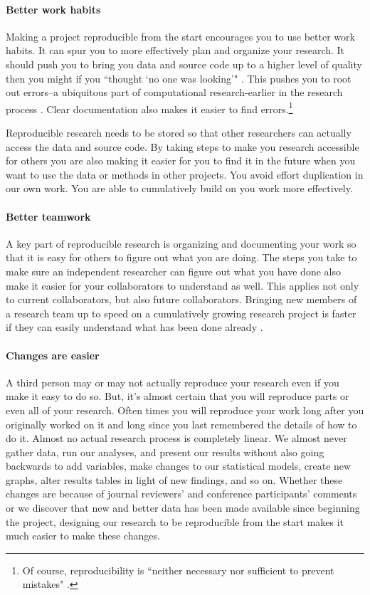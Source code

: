 \paragraph{Better work habits}
Making a project reproducible from the start encourages you to use better work habits. It can spur you to more effectively plan and organize your research. It should push you to bring you data and source code up to a higher level of quality then you might if you ``thought `no one was looking'" \cite[386]{Donoho2010}. This pushes you to root out errors--a ubiquitous part of computational research-earlier in the research process \cite[385]{Donoho2010}. Clear documentation also makes it easier to find errors.\footnote{Of course, reproducibility is ``neither necessary nor sufficient to prevent mistakes" \cite[]{Stodden2009b}.}

Reproducible research needs to be stored so that other researchers can actually access the data and source code. By taking steps to make you research accessible for others you are also making it easier for you to find it in the future when you want to use the data or methods in other projects. You avoid effort duplication in our own work. You are able to cumulatively build on you work more effectively.

\paragraph{Better teamwork}
A key part of reproducible research is organizing and documenting your work so that it is easy for others to figure out what you are doing. The steps you take to make sure an independent researcher can figure out what you have done also make it easier for your collaborators to understand as well. This applies not only to current collaborators, but also future collaborators. Bringing new members of a research team up to speed on a cumulatively growing research project is faster if they can easily understand what has been done already \cite[386]{Donoho2010}. 

\paragraph{Changes are easier}
A third person may or may not actually reproduce your research even if you make it easy to do so. But, it's almost certain that you will reproduce parts or even all of your research. Often times you will reproduce your work long after you originally worked on it and long since you last remembered the details of how to do it. Almost no actual research process is completely linear. We almost never gather data, run our analyses, and present our results without also going backwards to add variables, make changes to our statistical models, create new graphs, alter results tables in light of new findings, and so on. Whether these changes are because of journal reviewers' and conference participants' comments or we discover that new and better data has been made available since beginning the project, designing our research to be reproducible from the start makes it much easier to make these changes. 

